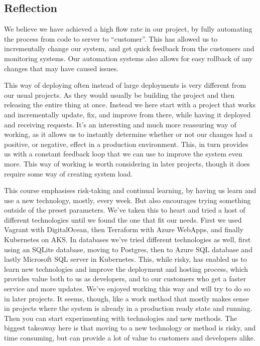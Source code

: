 \subsection{Reflection}
We believe we have achieved a high flow rate in our project, by fully automating the process from code to server to ``customer''.
This has allowed us to incrementally change our system, and get quick feedback from the customers and monitoring systems.
Our automation systems also allows for easy rollback of any changes that may have caused issues.

This way of deploying often instead of large deployments is very different from our usual projects. As they would usually be building the project and then releasing the entire thing at once.
Instead we here start with a project that works and incrementally update, fix, and improve from there, while having it deployed and receiving requests.
It's an interesting and much more reassuring way of working, as it allows us to instantly determine whether or not our changes had a positive, or negative, effect in a production environment.
This, in turn provides us with a constant feedback loop that we can use to improve the system even more.
This way of working is worth considering in later projects, though it does require some way of creating system load.

This course emphasises risk-taking and continual learning, by having us learn and use a new technology, mostly, every week.
But also encourages trying something outside of the preset parameters.
We've taken this to heart and tried a host of different technologies until we found the one that fit our needs. First we used Vagrant with DigitalOcean, then Terraform with Azure WebApps, and finally Kubernetes on AKS.
In databases we've tried different technologies as well, first using an SQLite database, moving to Postgres, then to Azure SQL database and lastly Microsoft SQL server in Kubernetes.
This, while risky, has enabled us to learn new technologies and improve the deployment and hosting process, which provides value both to us as developers, and to our customers who get a faster service and more updates.
We've enjoyed working this way and will try to do so in later projects.
It seems, though, like a work method that mostly makes sense in projects where the system is already in a production ready state and running.
Then you can start experimenting with technologies and new methods.
The biggest takeaway here is that moving to a new technology or method is risky, and time consuming, but can provide a lot of value to customers and developers alike.

